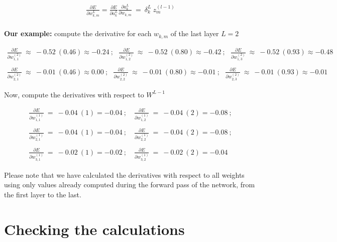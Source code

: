\documentclass{article}
\begin{document}
\begin{gather*}
\frac{\partial E}{\partial w_{k,m}^{L}}
= \frac{\partial E}{\partial a_{k}^{L}} \frac{\partial a_{k}^{L}}{\partial w_{k,m}} \ =\ \delta_k^{L} \ z_{m}^{( l-1)} \label{eq:delta-from-w}
\end{gather*}\\

\textbf{Our example:}  compute the derivative for each  $w_{k,m}$ of the last layer $L=2$


{\small
\begin{gather*}
\frac{\partial E}{\partial w_{1,1}^{( 2)}} \ \approx\ -0.52\ ( 0.46 ) \approx -0.24 \ ;\ \ \
\frac{\partial E}{\partial w_{1,2}^{( 2)}} \ \approx\ -0.52\ ( 0.80 ) \approx -0.42 \ ;\ \ \
\frac{\partial E}{\partial w_{1,3}^{( 2)}} \ \approx\ -0.52\ ( 0.93 ) \approx -0.48 \\
\\
\frac{\partial E}{\partial w_{2,1}^{( 2)}} \ \approx\ -0.01\ ( 0.46 ) \approx 0.00 \ ;\ \ \
\frac{\partial E}{\partial w_{2,2}^{( 2)}} \ \approx\ -0.01\ ( 0.80 ) \approx -0.01 \ ;\ \ \
\frac{\partial E}{\partial w_{2,3}^{( 2)}} \ \approx\ -0.01\ ( 0.93 ) \approx -0.01
\end{gather*}
}


Now, compute the derivatives with respect to $W^{L-1}$


{\small
\begin{gather*}
\frac{\partial E}{\partial w_{1,1}^{( 1)}} \ =\ -0.04\ ( 1 ) = -0.04 \ ;\quad
\frac{\partial E}{\partial w_{1,2}^{( 1)}} \ =\ -0.04\ ( 2 ) = -0.08 \ ;\\
\\
\frac{\partial E}{\partial w_{2,1}^{( 1)}} \ =\ -0.04\ ( 1 ) = -0.04 \ ;\quad
\frac{\partial E}{\partial w_{2,2}^{( 1)}} \ =\ -0.04\ ( 2 ) = -0.08 \ ;\\
\\
\frac{\partial E}{\partial w_{3,1}^{( 1)}} \ =\ -0.02\ ( 1 ) = -0.02 \ ;\quad
\frac{\partial E}{\partial w_{3,2}^{( 1)}} \ =\ -0.02\ ( 2 ) = -0.04
\end{gather*}
}

 Please note that we have calculated the derivatives with respect to all weights using only values already computed during the forward pass of the network, from the first layer to the last.

\section{Checking the calculations}
\end{document}
